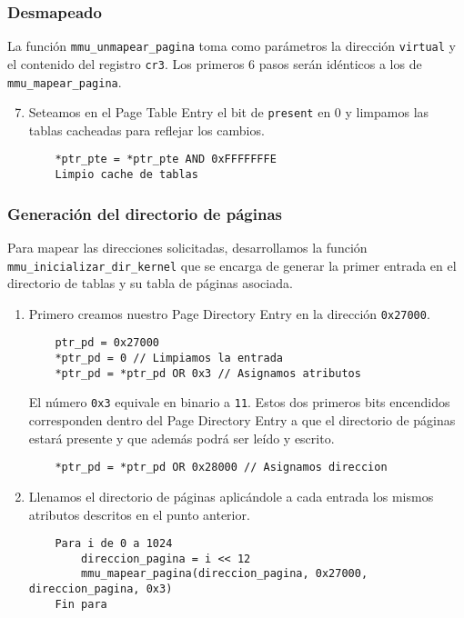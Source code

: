 \subsubsection*{Desmapeado}

La función \texttt{mmu\_unmapear\_pagina} toma como parámetros la dirección
\texttt{virtual} y el contenido del registro \texttt{cr3}. Los primeros 6 pasos
serán idénticos a los de \texttt{mmu\_mapear\_pagina}.

\begin{enumerate}
	\setcounter{enumi}{6}
	\item Seteamos en el Page Table Entry el bit de \texttt{present} en 0 y
		limpamos las tablas cacheadas para reflejar los cambios.
	\begin{lstlisting}
	*ptr_pte = *ptr_pte AND 0xFFFFFFFE
	Limpio cache de tablas
	\end{lstlisting}
\end{enumerate}

\subsubsection{Generación del directorio de páginas}

Para mapear las direcciones solicitadas, desarrollamos la función
\texttt{mmu\_inicializar\_dir\_kernel} que se encarga de generar la primer
entrada en el directorio de tablas y su tabla de páginas asociada.

\begin{enumerate}
	\item Primero creamos nuestro Page Directory Entry en la dirección
		\texttt{0x27000}.
	\begin{lstlisting}
	ptr_pd = 0x27000
	*ptr_pd = 0 // Limpiamos la entrada
	*ptr_pd = *ptr_pd OR 0x3 // Asignamos atributos
	\end{lstlisting}
	El número \texttt{0x3} equivale en binario a \texttt{11}. Estos dos primeros
	bits encendidos corresponden dentro del Page Directory Entry a que el
	directorio de páginas estará presente y que además podrá ser leído y
	escrito.
	\begin{lstlisting}
	*ptr_pd = *ptr_pd OR 0x28000 // Asignamos direccion
	\end{lstlisting}

	\item Llenamos el directorio de páginas aplicándole a cada entrada los
		mismos atributos descritos en el punto anterior.
	\begin{lstlisting}
	Para i de 0 a 1024
		direccion_pagina = i << 12
		mmu_mapear_pagina(direccion_pagina, 0x27000, direccion_pagina, 0x3)
	Fin para
	\end{lstlisting}
\end{enumerate}

